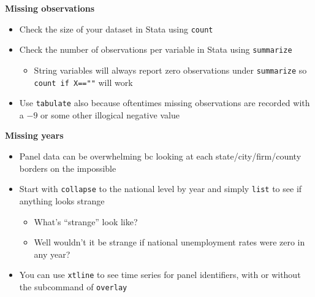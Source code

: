 \documentclass[notes=show]{beamer}
\begin{document}
\begin{frame}[plain]
\begin{center}
\textbf{Missing observations}
\end{center}

\begin{itemize}
\item Check the size of your dataset in Stata using \texttt{count}
\item Check the number of observations per variable in Stata using \texttt{summarize}
	\begin{itemize}
	\item String variables will always report zero observations under \texttt{summarize} so \texttt{count if X==""} will work
	\end{itemize}
\item Use \texttt{tabulate} also because oftentimes missing observations are recorded with a $-9$ or some other illogical negative value
\end{itemize}

\end{frame}

\begin{frame}[plain]
\begin{center}
\textbf{Missing years}
\end{center}

\begin{itemize}
\item Panel data can be overwhelming bc looking at each state/city/firm/county borders on the impossible
\item Start with \texttt{collapse} to the national level by year and simply \texttt{list} to see if anything looks strange
	\begin{itemize}
	\item What's ``strange'' look like?
	\item Well wouldn't it be strange if national unemployment rates were zero in any year?
	\end{itemize}
\item You can use \texttt{xtline} to see time series for panel identifiers, with or without the subcommand of \texttt{overlay}
\end{itemize}

\end{frame}
\end{document}
